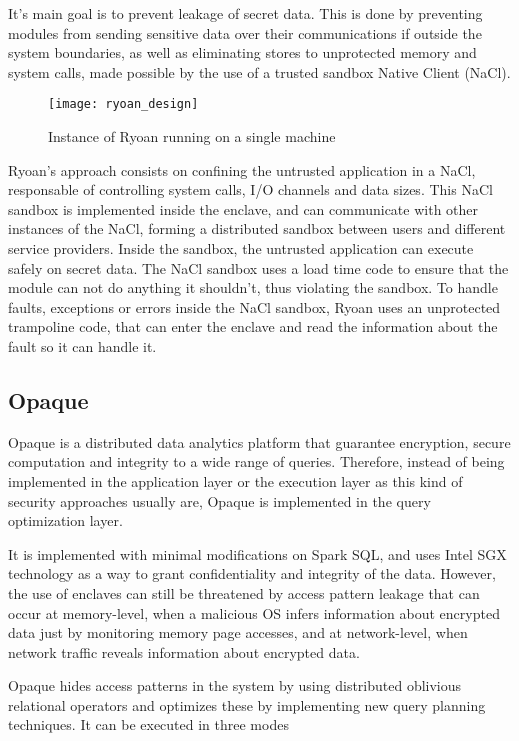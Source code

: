 It's main goal is to prevent leakage of secret data. This is done by preventing modules from sending sensitive data over their communications if outside the system boundaries, as well as eliminating stores to unprotected memory and system calls, made possible by the use of a trusted sandbox Native Client (NaCl). 

\begin{figure}[htbp]
	\centering
	{\texttt{[image: ryoan\_design]}}%
	\caption{Instance of Ryoan running on a single machine}
\end{figure}

Ryoan's approach consists on confining the untrusted application in a NaCl, responsable of controlling system calls, I/O channels and data sizes. This NaCl sandbox is implemented inside the enclave, and can communicate with other instances of the NaCl, forming a distributed sandbox between users and different service providers. Inside the sandbox, the untrusted application can execute safely on secret data. The NaCl sandbox uses a load time code to ensure that the module can not do anything it shouldn't, thus violating the sandbox. To handle faults, exceptions or errors inside the NaCl sandbox, Ryoan uses an unprotected trampoline code, that can enter the enclave and read the information about the fault so it can handle it.



\subsection{Opaque}

Opaque \cite{opaquePaper} is a distributed data analytics platform that guarantee encryption, secure computation and integrity to a wide range of queries. Therefore, instead of being implemented in the application layer or the execution layer as this kind of security approaches usually are, Opaque is implemented in the query optimization layer. 

It is implemented with minimal modifications on Spark SQL, and uses Intel SGX technology as a way to grant confidentiality and integrity of the data. 
However, the use of enclaves can still be threatened by access pattern leakage that can occur at memory-level, when a malicious OS infers information about encrypted data just by monitoring memory page accesses, and at network-level, when network traffic reveals information about encrypted data.

Opaque hides access patterns in the system by using distributed oblivious relational operators and optimizes these by implementing new query planning techniques. It can be executed in three modes

